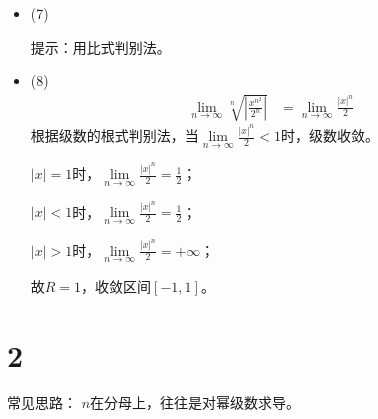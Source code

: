 \documentclass{article}
\begin{document}
\begin{itemize}
  \item (7)

        提示：用比式判别法。

  \item (8)
        \begin{align*}
          \lim\limits_{n \to \infty} \sqrt[n]{\left|\frac{x^{n^2}}{2^n}\right|}
           & = \lim\limits_{n \to \infty} \frac{|x|^n}{2}
        \end{align*}
        根据级数的根式判别法，当$\lim\limits_{n \to \infty} \frac{|x|^n}{2} < 1$时，级数收敛。

        $|x| = 1$时，$\lim\limits_{n \to \infty} \frac{|x|^n}{2} = \frac{1}{2}$；

        $|x| < 1$时，$\lim\limits_{n \to \infty} \frac{|x|^n}{2} = \frac{1}{2}$；

        $|x| > 1$时，$\lim\limits_{n \to \infty} \frac{|x|^n}{2} = +\infty$；

        故$R = 1$，收敛区间$[-1, 1]$。

\end{itemize}

\section*{2}

常见思路：
$n$在分母上，往往是对幂级数求导。
\end{document}
